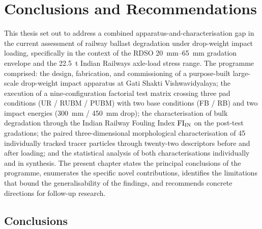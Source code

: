 \chapter{Conclusions and Recommendations}
\label{ch:conclusions}

This thesis set out to address a combined apparatus-and-characterisation gap in the current assessment of railway ballast degradation under drop-weight impact loading, specifically in the context of the RDSO \qtyrange{20}{65}{\mm} gradation envelope and the \qty{22.5}{\tonne} Indian Railways axle-load stress range. The programme comprised: the design, fabrication, and commissioning of a purpose-built large-scale drop-weight impact apparatus at Gati Shakti Vishwavidyalaya; the execution of a nine-configuration factorial test matrix crossing three pad conditions (UR / RUBM / PUBM) with two base conditions (FB / RB) and two impact energies (\qty{300}{\mm} / \qty{450}{\mm} drop); the characterisation of bulk degradation through the Indian Railway Fouling Index $\mathrm{FI}_{\mathrm{IN}}$ on the post-test gradations; the paired three-dimensional morphological characterisation of 45 individually tracked tracer particles through twenty-two descriptors before and after loading; and the statistical analysis of both characterisations individually and in synthesis. The present chapter states the principal conclusions of the programme, enumerates the specific novel contributions, identifies the limitations that bound the generalisability of the findings, and recommends concrete directions for follow-up research.

\section{Conclusions}
\label{sec:conclusions}

